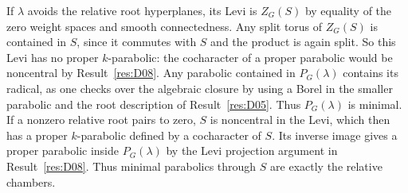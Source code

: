 \documentclass[11pt,a4paper,openany,oneside]{book}
\theoremstyle{resultstyle}
\theoremstyle{definition}
\numberwithin{equation}{chapter}
\begin{document}
If \(\lambda\) avoids the relative root hyperplanes,
its Levi is \(Z_G(S)\) by equality of the zero weight
spaces and smooth connectedness. Any split torus of
\(Z_G(S)\) is contained in \(S\), since it commutes with
\(S\) and the product is again split. So this Levi
has no proper \(k\)-parabolic: the cocharacter of a
proper parabolic would be noncentral by
Result~\ref{res:D08}. Any parabolic contained in
\(P_G(\lambda)\) contains its radical, as one checks
over the algebraic closure by using a Borel in the
smaller parabolic and the root description of
Result~\ref{res:D05}. Thus \(P_G(\lambda)\) is minimal.
If a nonzero relative root pairs to zero, \(S\) is
noncentral in the Levi, which then has a proper
\(k\)-parabolic defined by a cocharacter of \(S\).
Its inverse image gives a proper parabolic inside
\(P_G(\lambda)\) by the Levi projection argument in
Result~\ref{res:D08}. Thus minimal parabolics through
\(S\) are exactly the relative chambers.
\end{document}
